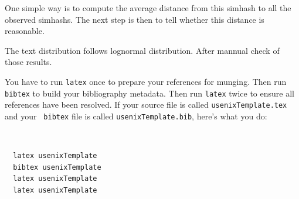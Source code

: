 One simple way is to compute the average distance from this simhash to all the observed simhashs. The next step is then to tell whether this distance is reasonable. 

The text distribution follows lognormal distribution.
After mannual check of those results.




You have to run {\tt latex} once to prepare your references for
munging.  Then run {\tt bibtex} to build your bibliography metadata.
Then run {\tt latex} twice to ensure all references have been resolved.
If your source file is called {\tt usenixTemplate.tex} and your {\tt
bibtex} file is called {\tt usenixTemplate.bib}, here's what you do:
{\tt \small
  \begin{verbatim}
  latex usenixTemplate
  bibtex usenixTemplate
  latex usenixTemplate
  latex usenixTemplate
  \end{verbatim}
}


